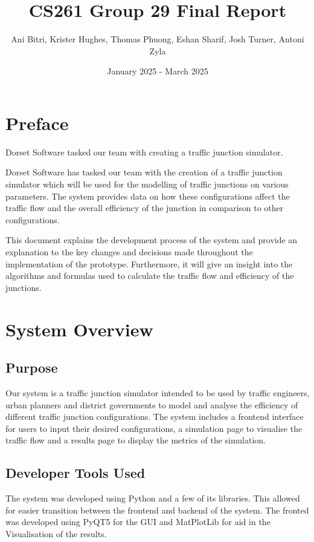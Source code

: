 \documentclass{article}
\title{\vspace{-1.5cm}CS261 Group 29 Final Report}
\author{Ani Bitri, Krister Hughes, Thomas Phuong, Eshan Sharif, Josh Turner, Antoni Zyla}
\date{January 2025 - March 2025}
\begin{document}
    \maketitle

    \tableofcontents

    \section{Preface}

    Dorset Software tasked our team with creating a traffic junction simulator.

    Dorset Software has tasked our team with the creation of a traffic junction simulator which will be used for the modelling of traffic junctions on various parameters. The system provides data on how these configurations
    affect the traffic flow and the overall efficiency of the junction in comparison to other configurations.

    This document explains the development process of the system and provide an explanation to the key changes and decisions made throughout the implementation of the prototype. Furthermore,
    it will give an insight into the algorithms and formulas used to calculate the traffic flow and efficiency of the junctions.


    \section{System Overview}

    \subsection{Purpose}

    Our system is a traffic junction simulator intended to be used by traffic engineers, urban planners and district governments to model and analyse the efficiency of different traffic junction configurations. The
    system includes a frontend interface for users to input their desired configurations, a simulation page to visualise the traffic flow and a results page to display the metrics of the simulation.

    \subsection{Developer Tools Used}

    The system was developed using Python and a few of its libraries. This allowed for easier transition between the frontend and backend of the system. The
    fronted was developed using PyQT5 for the GUI and MatPlotLib for aid in the Visualisation of the results.
\end{document}
